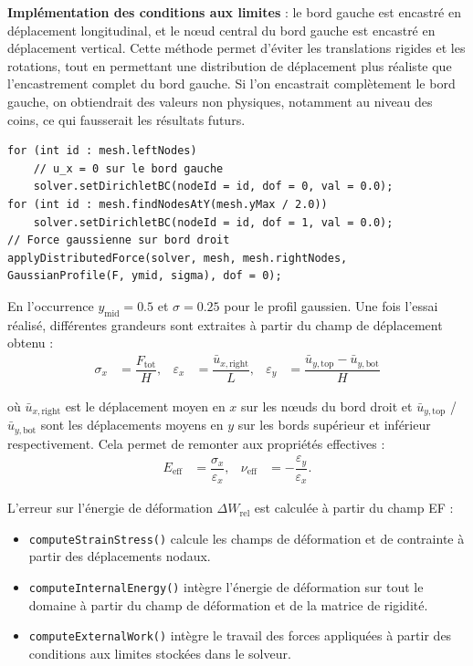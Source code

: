 \documentclass[a4paper,11pt]{article}
\begin{document}
\textbf{Implémentation des conditions aux limites} : le bord gauche est encastré en déplacement longitudinal, et le nœud central du bord gauche est encastré en déplacement vertical. Cette méthode permet d'éviter les translations rigides et les rotations, tout en permettant une distribution de déplacement plus réaliste que l'encastrement complet du bord gauche. Si l'on encastrait complètement le bord gauche, on obtiendrait des valeurs non physiques, notamment au niveau des coins, ce qui fausserait les résultats futurs.
{\footnotesize
\begin{verbatim}
for (int id : mesh.leftNodes)
    // u_x = 0 sur le bord gauche
    solver.setDirichletBC(nodeId = id, dof = 0, val = 0.0); 
for (int id : mesh.findNodesAtY(mesh.yMax / 2.0))
    solver.setDirichletBC(nodeId = id, dof = 1, val = 0.0); 
// Force gaussienne sur bord droit
applyDistributedForce(solver, mesh, mesh.rightNodes, GaussianProfile(F, ymid, sigma), dof = 0);
\end{verbatim}
}
En l'occurrence $y_\mathrm{mid} = 0.5$ et $\sigma = 0.25$ pour le profil gaussien. Une fois l'essai réalisé, différentes grandeurs sont extraites à partir du champ de déplacement obtenu :
\begin{align}
\sigma_x &= \dfrac{F_{\mathrm{tot}}}{H}, 
& \varepsilon_x &= \dfrac{\bar{u}_{x,\mathrm{right}}}{L}, 
& \varepsilon_y &= \dfrac{\bar{u}_{y,\mathrm{top}} - \bar{u}_{y,\mathrm{bot}}}{H}
\label{eq:traction_metrics}
\end{align}

où $\bar{u}_{x,\mathrm{right}}$ est le déplacement moyen en $x$ sur les nœuds du bord droit et $\bar{u}_{y,\mathrm{top}}$ / $\bar{u}_{y,\mathrm{bot}}$ sont les déplacements moyens en $y$ sur les bords supérieur et inférieur respectivement. Cela permet de remonter aux propriétés effectives :
\begin{align}
    E_{\mathrm{eff}} &= \dfrac{\sigma_x}{\varepsilon_x}, 
    & \nu_{\mathrm{eff}} &= -\dfrac{\varepsilon_y}{\varepsilon_x}.
\end{align}

L'erreur sur l'énergie de déformation $\Delta W_{\mathrm{rel}}$ est calculée à partir du champ EF :
\begin{itemize}
    \item \texttt{computeStrainStress()} calcule les champs de déformation et de contrainte à partir des déplacements nodaux.
    \item \texttt{computeInternalEnergy()} intègre l'énergie de déformation sur tout le domaine à partir du champ de déformation et de la matrice de rigidité.
    \item \texttt{computeExternalWork()} intègre le travail des forces appliquées à partir des conditions aux limites stockées dans le solveur.
\end{itemize}
\end{document}

